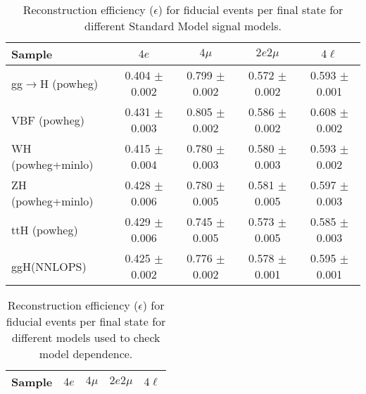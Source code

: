  
 
\begin{table}[!h!tb]
\begin{center}
\small
\caption{
Reconstruction efficiency ($\epsilon$) for fiducial events per final state for different Standard Model signal models.
\label{tab:efficiencySM}
}
\begin{tabular}{|l|c|c|c|c|} \hline 
Sample & $4e$ & $4\mu$ & $2e2\mu$ & $4\ell$ \\ \hline 
gg$\rightarrow$H ({\sc powheg})  & 0.404 $\pm$ 0.002 & 0.799 $\pm$ 0.002 & 0.572 $\pm$ 0.002 & 0.593 $\pm$ 0.001 \\ 
VBF ({\sc powheg})  & 0.431 $\pm$ 0.003 & 0.805 $\pm$ 0.002 & 0.586 $\pm$ 0.002 & 0.608 $\pm$ 0.002 \\ 
WH ({\sc powheg+minlo}) & 0.415 $\pm$ 0.004 & 0.780 $\pm$ 0.003 & 0.580 $\pm$ 0.003 & 0.593 $\pm$ 0.002 \\ 
ZH ({\sc powheg+minlo})  & 0.428 $\pm$ 0.006 & 0.780 $\pm$ 0.005 & 0.581 $\pm$ 0.005 & 0.597 $\pm$ 0.003 \\ 
ttH ({\sc powheg}) & 0.429 $\pm$ 0.006 & 0.745 $\pm$ 0.005 & 0.573 $\pm$ 0.005 & 0.585 $\pm$ 0.003 \\ 
ggH(NNLOPS) & 0.425 $\pm$ 0.002 & 0.776 $\pm$ 0.002 & 0.578 $\pm$ 0.001 & 0.595 $\pm$ 0.001 \\ 

\hline
\end{tabular}
\normalsize
\end{center}
\end{table}
 
 
 
\begin{table}[!h!tb]
\begin{center}
\small
\caption{
Reconstruction efficiency ($\epsilon$) for fiducial events per final state for different models used to check model dependence.
\label{tab:efficiencyExo}
}
\begin{tabular}{|l|c|c|c|c|} \hline 
Sample & $4e$ & $4\mu$ & $2e2\mu$ & $4\ell$ \\ \hline 

\hline
\end{tabular}
\normalsize
\end{center}
\end{table}
 
 
 
